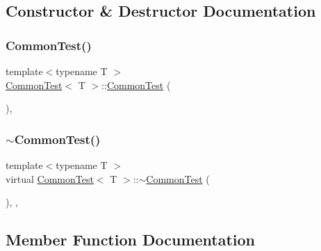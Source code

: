 \subsection{Constructor \& Destructor Documentation}
\mbox{\label{classCommonTest_abd5ec205d90f4b81efab2a6f972f3db0}} 
\subsubsection{\texorpdfstring{CommonTest()}{CommonTest()}}
{\footnotesize\ttfamily template$<$typename T $>$ \\
\mbox{\hyperlink{classCommonTest}{Common\+Test}}$<$ T $>$\+::\mbox{\hyperlink{classCommonTest}{Common\+Test}} (\begin{DoxyParamCaption}{ }\end{DoxyParamCaption})\hspace{0.3cm}{\ttfamily [inline]}, {\ttfamily [protected]}}

\mbox{\label{classCommonTest_a675a632fcf7b1fd961fefc619d6a458d}} 
\subsubsection{\texorpdfstring{$\sim$CommonTest()}{~CommonTest()}}
{\footnotesize\ttfamily template$<$typename T $>$ \\
virtual \mbox{\hyperlink{classCommonTest}{Common\+Test}}$<$ T $>$\+::$\sim$\mbox{\hyperlink{classCommonTest}{Common\+Test}} (\begin{DoxyParamCaption}{ }\end{DoxyParamCaption})\hspace{0.3cm}{\ttfamily [inline]}, {\ttfamily [protected]}, {\ttfamily [virtual]}}



\subsection{Member Function Documentation}
\mbox{\label{classCommonTest_a4c7bf7889ce48a9d06530bc4a437f3f5}} 
